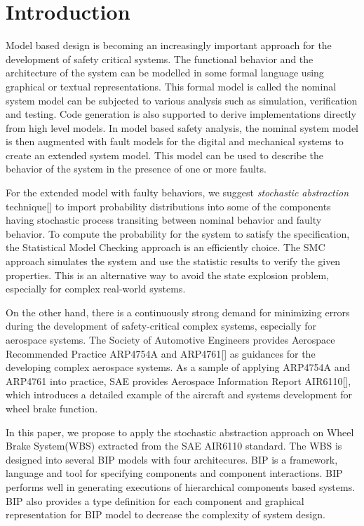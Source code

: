 
\section{Introduction}
Model based design is becoming an increasingly important approach for the development of safety critical systems.
The functional behavior and the architecture of the system can be modelled in some formal language using graphical or textual representations.
This formal model is called the nominal system model can be subjected to various analysis such as simulation, verification and testing.
Code generation is also supported to derive implementations directly from high level models.
In model based safety analysis, the nominal system model is then augmented with fault models for the digital and mechanical systems to create an extended system model.
This model can be used to describe the behavior of the system in the presence of one or more faults.

For the extended model with faulty behaviors, we suggest \emph{stochastic abstraction} technique[] to import probability distributions into some of the components having stochastic process transiting between nominal behavior and faulty behavior.
To compute the probability for the system to satisfy the specification, the Statistical Model Checking approach is an efficiently choice. The SMC approach simulates the system and use the statistic results to verify the given properties. 
This is an alternative way to avoid the state explosion problem, especially for complex real-world systems.

On the other hand, there is a continuously strong demand for minimizing errors during the development of safety-critical complex systems, especially for aerospace systems.
The Society of Automotive Engineers provides Aerospace Recommended Practice ARP4754A and ARP4761[] as guidances for the developing complex aerospace systems. As a sample of applying ARP4754A and ARP4761 into practice, SAE provides Aerospace Information Report AIR6110[], which introduces a detailed example of the aircraft and systems development for wheel brake function.

In this paper, we propose to apply the stochastic abstraction approach on Wheel Brake System(WBS) extracted from the SAE AIR6110 standard. The WBS is designed into several BIP models with four architecures. BIP is a framework, language and tool for specifying components and component interactions. BIP performs well in generating executions of hierarchical components based systems. BIP also provides a type definition for each component and graphical representation for BIP model to decrease the complexity of system design.

